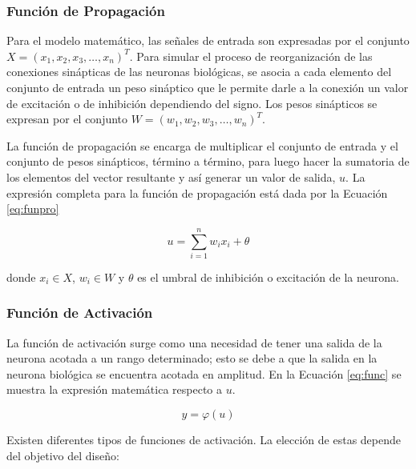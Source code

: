 \subsubsection{Función de Propagación}

Para el modelo matemático, las señales de entrada son expresadas por el conjunto $X=(x_1, x_2, x_3, \ldots, x_n)^T$. Para simular el proceso de reorganización de las conexiones sinápticas de las neuronas biológicas, se asocia a cada elemento del conjunto de entrada un peso sináptico que le permite darle a la conexión un valor de excitación o de inhibición dependiendo del signo. Los pesos sinápticos se expresan por el conjunto $W=(w_1, w_2, w_3, \ldots, w_n)^T$.

La función de propagación se encarga de multiplicar el conjunto de entrada y el conjunto de pesos sinápticos, término a término, para luego hacer la sumatoria de los elementos del vector resultante y así generar un valor de salida, $u$. La expresión completa para la función de propagación está dada por la Ecuación \ref{eq:funpro}

\begin{equation}\label{eq:funpro}
  u=\sum_{i=1}^{n} w_ix_i + \theta
\end{equation}

donde $x_i \in X$, $w_i \in W$ y $\theta$ es el umbral de inhibición o excitación de la neurona.

\subsubsection{Función de  Activación}

La función de activación surge como una necesidad de tener una salida de la neurona acotada a un rango determinado; esto se debe a que la salida en la neurona biológica se encuentra acotada en amplitud. En la Ecuación \ref{eq:func} se muestra la expresión matemática respecto a $u$.

\begin{equation}\label{eq:func}
  y=\varphi(u)
\end{equation}

Existen diferentes tipos de funciones de activación. La elección de estas depende del objetivo del diseño:

